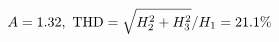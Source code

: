 \documentclass[preview]{standalone}
\begin{document}
\begin{align*}
\special{dvisvgm:raw <g id='unique000'>}A=1.32,\ \text{THD}=\sqrt{H_2^2+H_3^2}/H_1=21.1\%\special{dvisvgm:raw </g>}
\end{align*}
\end{document}
